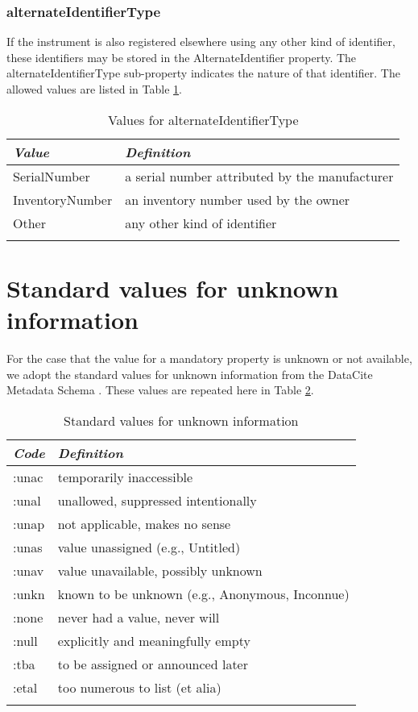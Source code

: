 \documentclass[titlepage=true,twoside=false,DIV=13]{scrartcl}
\begin{document}
\subsubsection{alternateIdentifierType}

If the instrument is also registered elsewhere using any other kind of
identifier, these identifiers may be stored in the AlternateIdentifier
property.  The alternateIdentifierType sub-property indicates the
nature of that identifier.  The allowed values are listed in Table
\ref{tab:schema:values:alternateIdentifierType}.

\begin{longtable}{|l|l|}
  \hline
  \emph{Value} & \emph{Definition} \\
  \hline \endhead
  \hline \endfoot\endlastfoot
  SerialNumber    & a serial number attributed by the manufacturer \\
  InventoryNumber & an inventory number used by the owner \\
  Other           & any other kind of identifier \\
  \hline
  \caption{Values for alternateIdentifierType}
  \label{tab:schema:values:alternateIdentifierType}
\end{longtable}

\appendix

\section{Standard values for unknown information}
\label{appendix:unknown}

For the case that the value for a mandatory property is unknown or not
available, we adopt the standard values for unknown information from
the DataCite Metadata Schema \cite{datacite:schema}.  These values are
repeated here in Table \ref{tab:appendix:unknown}.

\begin{longtable}{|l|l|}
  \hline
  \emph{Code} & \emph{Definition} \\
  \hline \endhead
  \hline \endfoot\endlastfoot
  :unac & temporarily inaccessible \\
  :unal & unallowed, suppressed intentionally \\
  :unap & not applicable, makes no sense \\
  :unas & value unassigned (e.g., Untitled) \\
  :unav & value unavailable, possibly unknown \\
  :unkn & known to be unknown (e.g., Anonymous, Inconnue) \\
  :none & never had a value, never will \\
  :null & explicitly and meaningfully empty \\
  :tba  & to be assigned or announced later \\
  :etal & too numerous to list (et alia) \\
  \hline
  \caption{Standard values for unknown information}
  \label{tab:appendix:unknown}
\end{longtable}



\end{document}
